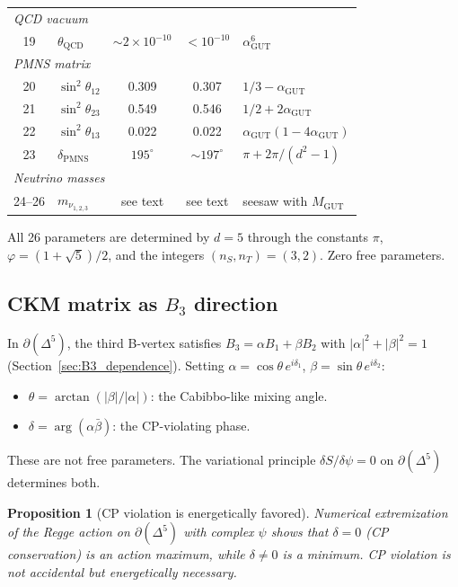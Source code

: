 \documentclass[12pt]{article}
\newtheorem{proposition}[theorem]{Proposition}
\theoremstyle{remark}
\theoremstyle{definition}
\newcommand{\agut}{\alpha_{\mathrm{GUT}}}
\begin{document}
\begin{center}
\begin{tabular}{clccl}
\multicolumn{5}{l}{\emph{QCD vacuum}} \\
19 & $\theta_\text{QCD}$ & $\sim 2\!\times\! 10^{-10}$ & $< 10^{-10}$ & $\alpha_\text{GUT}^6$ \\
\hline
\multicolumn{5}{l}{\emph{PMNS matrix}} \\
20 & $\sin^2\theta_{12}$ & 0.309 & 0.307 & $1/3 - \alpha_\text{GUT}$ \\
21 & $\sin^2\theta_{23}$ & 0.549 & 0.546 & $1/2 + 2\alpha_\text{GUT}$ \\
22 & $\sin^2\theta_{13}$ & 0.022 & 0.022 & $\agut(1-4\agut)$ \\
23 & $\delta_\text{PMNS}$ & $195^\circ$ & $\sim 197^\circ$ & $\pi + 2\pi/(d^2\!-\!1)$ \\
\hline
\multicolumn{5}{l}{\emph{Neutrino masses}} \\
24--26 & $m_{\nu_{1,2,3}}$ & see text & see text & seesaw with $M_\text{GUT}$ \\
\hline
\end{tabular}
\end{center}

\medskip
\noindent All 26 parameters are determined by $d = 5$ through the constants $\pi$, $\varphi = (1+\sqrt{5})/2$, and the integers $(n_S, n_T) = (3, 2)$. Zero free parameters.

\subsection{CKM matrix as $B_3$ direction}
\label{sec:ckm_geometry}

In $\partial(\Delta^5)$, the third B-vertex satisfies $B_3 = \alpha B_1 + \beta B_2$ with $|\alpha|^2 + |\beta|^2 = 1$ (Section~\ref{sec:B3_dependence}).  Setting $\alpha = \cos\theta\,e^{i\delta_1}$, $\beta = \sin\theta\,e^{i\delta_2}$:

\begin{itemize}
\item $\theta = \arctan(|\beta|/|\alpha|)$: the Cabibbo-like mixing angle.
\item $\delta = \arg(\alpha\bar\beta)$: the CP-violating phase.
\end{itemize}

These are not free parameters.  The variational principle $\delta S/\delta\psi = 0$ on $\partial(\Delta^5)$ determines both.

\begin{proposition}[CP violation is energetically favored]
\label{prop:cp}
Numerical extremization of the Regge action on $\partial(\Delta^5)$ with complex $\psi$ shows that $\delta = 0$ (CP conservation) is an action \emph{maximum}, while $\delta \neq 0$ is a \emph{minimum}.  CP violation is not accidental but energetically necessary.
\end{proposition}
\end{document}
